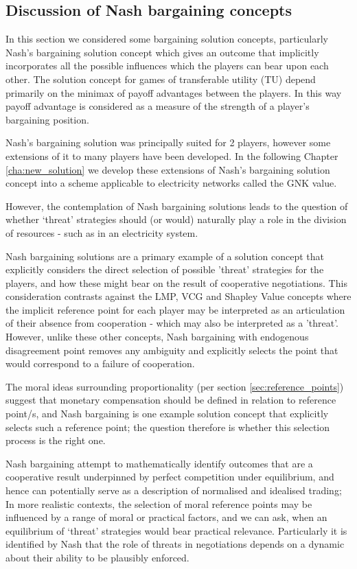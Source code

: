 \subsection{Discussion of Nash bargaining concepts}

In this section we considered some bargaining solution concepts, particularly Nash's bargaining solution concept which gives an outcome that implicitly incorporates all the possible influences which the players can bear upon each other.
The solution concept for games of transferable utility (TU) depend primarily on the minimax of payoff advantages between the players.
In this way payoff advantage is considered as a measure of the strength of a player's bargaining position.

Nash's bargaining solution was principally suited for 2 players, however some extensions of it to many players have been developed.
In the following Chapter \ref{cha:new_solution} we develop these extensions of Nash's bargaining solution concept into a scheme applicable to electricity networks called the GNK value.

However, the contemplation of Nash bargaining solutions leads to the question of whether `threat' strategies should (or would) naturally play a role in the division of resources - such as in an electricity system.

Nash bargaining solutions are a primary example of a solution concept that explicitly considers the direct selection of possible 'threat' strategies for the players, and how these might bear on the result of cooperative negotiations.
This consideration contrasts against the LMP, VCG and Shapley Value concepts where the implicit reference point for each player may be interpreted as an articulation of their absence from cooperation - which may also be interpreted as a 'threat'.
However, unlike these other concepts, Nash bargaining with endogenous disagreement point removes any ambiguity and explicitly selects the point that would correspond to a failure of cooperation.

The moral ideas surrounding proportionality (per section \ref{sec:reference_points}) suggest that monetary compensation should be defined in relation to reference point/s, and Nash bargaining is one example solution concept that explicitly selects such a reference point; the question therefore is whether this selection process is the right one.

Nash bargaining attempt to mathematically identify outcomes that are a cooperative result underpinned by perfect competition under equilibrium, and hence can potentially serve as a description of normalised and idealised trading;
In more realistic contexts, the selection of moral reference points may be influenced by a range of moral or practical factors, and we can ask, when an equilibrium of `threat' strategies would bear practical relevance.
Particularly it is identified by Nash that the role of threats in negotiations depends on a dynamic about their ability to be plausibly enforced.

